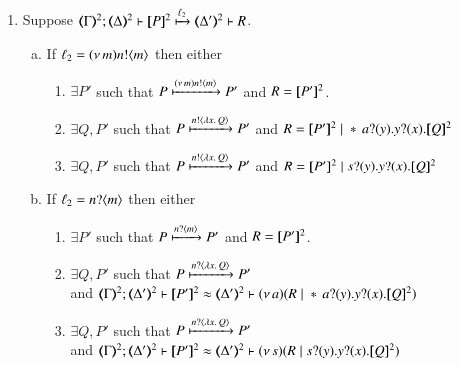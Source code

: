 \begin{proposition}
\begin{enumerate}[1.]
		\item Suppose 
		$\stytra{\mapt{\Gamma}^{2}}{\ell_2}{\mapt{\Delta}^{2}}{\map{P}^{2}}{\mapt{\Delta'}^{2}}{R}$.
			\begin{enumerate}[a)]
				\item %
					If  
					$\ell_2 = (\nu\, m)n ! \langle m \rangle$
					then 
					either 
					\begin{enumerate}[-]
					\item	$\exists P'$ such that $P \xmapsto{(\nu\, m) n !\langle m \rangle} P'$
						and $R = [\!\![P']\!\!]^2$.

					\item	$\exists Q, P'$ such that $P \xmapsto{n !\langle \lambda x.\,Q \rangle} P'$
						and $R = \map{P'}^{2} \Par \repl{} \binp{a}{y} \binp{y}{x} \pmap{Q}{2}$

					\item	$\exists Q, P'$ such that $P \xmapsto{n !\langle \lambda x.\,Q \rangle} P'$
						and $R = \map{P'}^{2} \Par \binp{s}{y} \binp{y}{x} \pmap{Q}{2}$
					\end{enumerate}

				\item   %
					If  $\ell_2 = n ? \langle m \rangle$ 
					then either
					\begin{enumerate}[-]
					\item	$\exists P'$ such that $P \xmapsto{n ?\langle m \rangle} P'$
						and $R = [\!\![P']\!\!]^2$.

					\item	$\exists Q, P'$ such that
						$P \xmapsto{n ?\langle \lambda x.\,Q \rangle} P'$\\
						and $\horel{\mapt{\Gamma}^{2}}{\mapt{\Delta'}^{2}}{\map{P'}^{2}}{\wb}{\mapt{\Delta'}^{2}}{\news{a}(R \Par \repl{} \binp{a}{y} \binp{y}{x} \pmap{Q}{2})}$
					\item	$\exists Q, P'$ such that
						$P \xmapsto{n ?\langle \lambda x.\,Q \rangle} P'$\\
						and $\horel{\mapt{\Gamma}^{2}}{\mapt{\Delta'}^{2}}{\map{P'}^{2}}{\wb}{\mapt{\Delta'}^{2}}{\news{s}(R \Par \binp{s}{y} \binp{y}{x} \pmap{Q}{2})}$  
					\end{enumerate}
		

\end{enumerate}
\end{enumerate}
\end{proposition}
